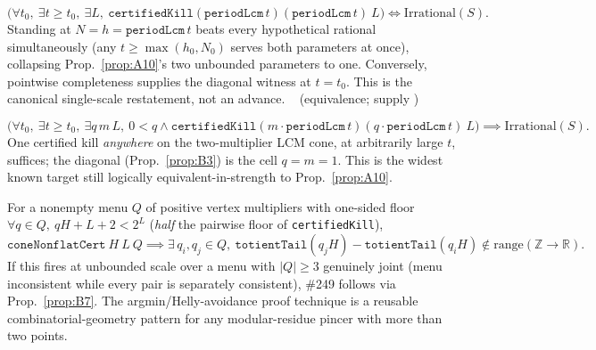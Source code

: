 \begin{prop}\label{prop:B3}
\[
\big(\forall t_0,\ \exists t\ge t_0,\ \exists L,\ \mathtt{certifiedKill}(\mathtt{periodLcm}\,t)(\mathtt{periodLcm}\,t)\ L\big)
\iff \mathrm{Irrational}(S).
\]
Standing at $N=h=\mathtt{periodLcm}\,t$ beats every hypothetical rational simultaneously (any
$t\ge\max(h_0,N_0)$ serves both parameters at once), collapsing Prop.~\ref{prop:A10}'s
two unbounded parameters to one. Conversely, pointwise completeness supplies
the diagonal witness at $t=t_0$.  This is the canonical single-scale
restatement, not an advance.
\  (equivalence; supply )\ \\
\end{prop}

\begin{prop}\label{prop:B7}
\[
\big(\forall t_0,\ \exists t\ge t_0,\ \exists q\,m\,L,\ 0<q \wedge \mathtt{certifiedKill}(m\cdot\mathtt{periodLcm}\,t)(q\cdot\mathtt{periodLcm}\,t)\ L\big)
\implies \mathrm{Irrational}(S).
\]
One certified kill \emph{anywhere} on the two-multiplier LCM cone, at arbitrarily large $t$,
suffices; the diagonal (Prop.~\ref{prop:B3}) is the cell $q=m=1$. This is the widest known
target still logically equivalent-in-strength to Prop.~\ref{prop:A10}.
\ \ \\
\end{prop}

\begin{prop}\label{prop:B10}
For a nonempty menu $Q$ of positive vertex multipliers with one-sided floor
$\forall q\in Q,\ qH+L+2<2^L$ (\emph{half} the pairwise floor of \texttt{certifiedKill}),
\[
\mathtt{coneNonflatCert}\ H\ L\ Q \implies \exists\, q_i,q_j\in Q,\ \mathtt{totientTail}(q_jH)-\mathtt{totientTail}(q_iH)\notin \mathrm{range}(\mathbb Z\to\mathbb R).
\]
If this fires at unbounded scale over a menu with $|Q|\ge3$ genuinely joint (menu inconsistent
while every pair is separately consistent), \#249 follows via Prop.~\ref{prop:B7}. The
argmin/Helly-avoidance proof technique is a reusable combinatorial-geometry pattern for any
modular-residue pincer with more than two points.
\ \ \\
\end{prop}

